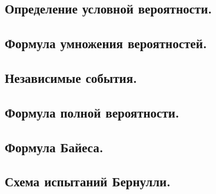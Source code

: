 \subsection{Определение условной вероятности.}



\newpage
\subsection{Формула умножения вероятностей.}



\newpage
\subsection{Независимые события.}



\newpage
\subsection{Формула полной вероятности.}



\newpage
\subsection{Формула Байеса.}



\newpage
\subsection{Схема испытаний Бернулли.}
